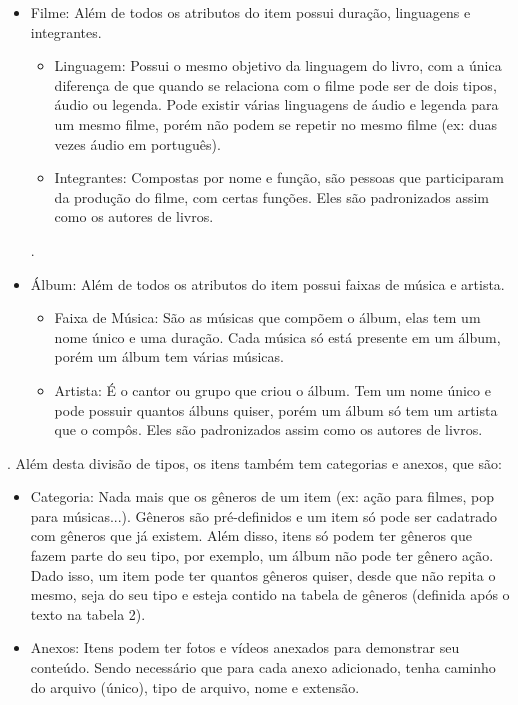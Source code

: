 \documentclass[a4paper, 11pt]{article}
\begin{document}
\begin{itemize}
\begin{itemize}
\begin{itemize}
        \end{itemize}.
        \item Filme: Além de todos os atributos do item possui duração, linguagens e integrantes.
        \begin{itemize}
            \item Linguagem: Possui o mesmo objetivo da linguagem do livro, com a única diferença de que quando se relaciona com o filme pode ser de dois tipos, áudio ou legenda. Pode existir várias linguagens de áudio e legenda para um mesmo filme, porém não podem se repetir no mesmo filme (ex: duas vezes áudio em português).
            \item Integrantes: Compostas por nome e função, são pessoas que participaram da produção do filme, com certas funções. Eles são padronizados assim como os autores de livros.
        \end{itemize}.
        \item Álbum: Além de todos os atributos do item possui faixas de música e artista.
        \begin{itemize}
            \item Faixa de Música: São as músicas que compõem o álbum, elas tem um nome único e uma duração. Cada música só está presente em um álbum, porém um álbum tem várias músicas.
            \item Artista: É o cantor ou grupo que criou o álbum. Tem um nome único e pode possuir quantos álbuns quiser, porém um álbum só tem um artista que o compôs. Eles são padronizados assim como os autores de livros.
        \end{itemize}
    \end{itemize}.
    Além desta divisão de tipos, os itens também tem categorias e anexos, que são:
    \begin{itemize}
        \item Categoria: Nada mais que os gêneros de um item (ex: ação para filmes, pop para músicas...). Gêneros são pré-definidos e um item só pode ser cadatrado com gêneros que já existem. Além disso, itens só podem ter gêneros que fazem parte do seu tipo, por exemplo, um álbum não pode ter gênero ação.\\
        Dado isso, um item pode ter quantos gêneros quiser, desde que não repita o mesmo, seja do seu tipo e esteja contido na tabela de gêneros (definida após o texto na tabela 2).
        \item Anexos: Itens podem ter fotos e vídeos anexados para demonstrar seu conteúdo. Sendo necessário que para cada anexo adicionado, tenha caminho do arquivo (único), tipo de arquivo, nome e extensão.
    \end{itemize}
\end{itemize}
\end{document}

